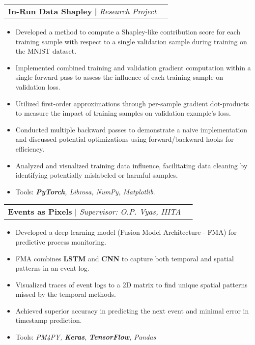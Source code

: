 \documentclass[letterpaper,11pt]{article}
\makeatletter
\newcommand{\resumeItem}[1]{
  \item\small{
    {#1 \vspace{-2pt}}
  }
}
\newcommand{\resumeProjectHeading}[2]{
    \item
    \begin{tabular*}{0.97\textwidth}{l@{\extracolsep{\fill}}r}
      \small#1 & #2 \\
    \end{tabular*}\vspace{-7pt}
}
\newcommand{\resumeItemListStart}{\begin{itemize}}
\newcommand{\resumeItemListEnd}{\end{itemize}\vspace{-5pt}}
\makeatother
\begin{document}
    \resumeProjectHeading
        {\textbf{In-Run Data Shapley} $|$ \emph{Research Project}}{}
        \resumeItemListStart
            \resumeItem{Developed a method to compute a Shapley-like contribution score for each training sample with respect to a single validation sample during training on the MNIST dataset.}
            \resumeItem{Implemented combined training and validation gradient computation within a single forward pass to assess the influence of each training sample on validation loss.}
            \resumeItem{Utilized first-order approximations through per-sample gradient dot-products to measure the impact of training samples on validation example's loss.}
            \resumeItem{Conducted multiple backward passes to demonstrate a naive implementation and discussed potential optimizations using forward/backward hooks for efficiency.}
            \resumeItem{Analyzed and visualized training data influence, facilitating data cleaning by identifying potentially mislabeled or harmful samples.}
            \resumeItem{Tools: \textit{\textbf{PyTorch}, Librosa, NumPy, Matplotlib}.}
        \resumeItemListEnd


    \resumeProjectHeading
        {\textbf{Events as Pixels} $|$ \emph{Supervisor: O.P. Vyas, IIITA}}{}
        \resumeItemListStart
            \resumeItem{Developed a deep learning model (Fusion Model Architecture - FMA) for predictive process monitoring.}
            \resumeItem{FMA combines \textbf{LSTM} and \textbf{CNN} to capture both temporal and spatial patterns in an event log.}
            \resumeItem{Visualized traces of event logs to a 2D matrix to find unique spatial patterns missed by the temporal methods.}
            \resumeItem{Achieved superior accuracy in predicting the next event and minimal error in timestamp prediction.}
            \resumeItem{Tools: \textit{PM4PY, \textbf{Keras}, \textbf{TensorFlow}, Pandas}}
        \resumeItemListEnd

%
\end{document}
